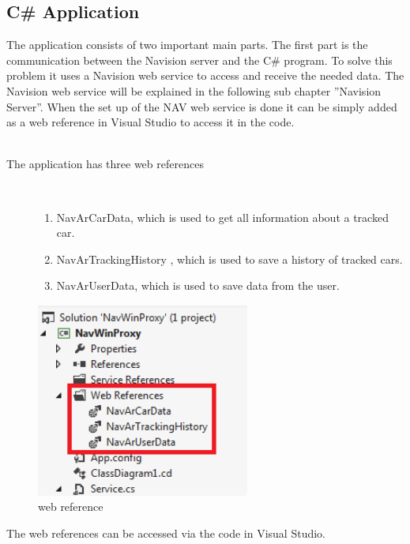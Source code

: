 \subsection{C\# Application}
The application consists of two important main parts. The first part is the communication between the Navision server and the C\# program. To solve this problem it uses a Navision web service to access and receive the needed data. The Navision web service will be explained in the following sub chapter ''Navision Server''. When the set up of the NAV web service is done it can be simply added as a web reference in Visual Studio to access it in the code.
\\\\
\begin{description}
   \item[The application has three web references]~\par
   \begin{enumerate}
      \item NavArCarData, which is used to get all information about a tracked car. 
      \item NavArTrackingHistory , which is used to save a history of tracked cars.
      \item	NavArUserData, which is used to save data from the user. 
   \end{enumerate}
\end{description}

\begin{figure}[htbp]
\centering
\includegraphics[width=70mm,height=\textheight,keepaspectratio]{graphics/webref.png}
\caption{web reference}
\end{figure}
\newpage
The web references can be accessed via the code in Visual Studio.
